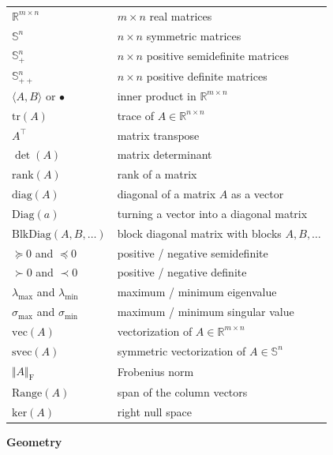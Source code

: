 \documentclass[
]{book}
\theoremstyle{definition}
\theoremstyle{definition}
\theoremstyle{definition}
\theoremstyle{definition}
\theoremstyle{remark}
\begin{document}
\begin{longtable}[]{@{}
  >{\raggedright\arraybackslash}p{}
  >{\raggedright\arraybackslash}p{}@{}}
\toprule()
\endhead
\(\mathbb{R}^{m \times n}\) & \(m \times n\) real matrices \\
\(\mathbb{S}^{n}\) & \(n\times n\) symmetric matrices \\
\(\mathbb{S}^{n}_{+}\) & \(n\times n\) positive semidefinite matrices \\
\(\mathbb{S}^{n}_{++}\) & \(n\times n\) positive definite matrices \\
\(\langle A, B \rangle\) or \(\bullet\) & inner product in \(\mathbb{R}^{m \times n}\) \\
\(\mathrm{tr}(A)\) & trace of \(A \in \mathbb{R}^{n \times n}\) \\
\(A^\top\) & matrix transpose \\
\(\det(A)\) & matrix determinant \\
\(\mathrm{rank}(A)\) & rank of a matrix \\
\(\mathrm{diag}(A)\) & diagonal of a matrix \(A\) as a vector \\
\(\mathrm{Diag}(a)\) & turning a vector into a diagonal matrix \\
\(\mathrm{BlkDiag}(A,B,\dots)\) & block diagonal matrix with blocks \(A,B,\dots\) \\
\(\succeq 0\) and \(\preceq 0\) & positive / negative semidefinite \\
\(\succ 0\) and \(\prec 0\) & positive / negative definite \\
\(\lambda_{\max}\) and \(\lambda_{\min}\) & maximum / minimum eigenvalue \\
\(\sigma_{\max}\) and \(\sigma_{\min}\) & maximum / minimum singular value \\
\(\mathrm{vec}(A)\) & vectorization of \(A \in \mathbb{R}^{m \times n}\) \\
\(\mathrm{svec}(A)\) & symmetric vectorization of \(A \in \mathbb{S}^{n}\) \\
\(\Vert A \Vert_\mathrm{F}\) & Frobenius norm \\
\(\mathrm{Range}(A)\) & span of the column vectors \\
\(\mathrm{ker}(A)\) & right null space \\
\bottomrule()
\end{longtable}

\textbf{Geometry}
\end{document}
